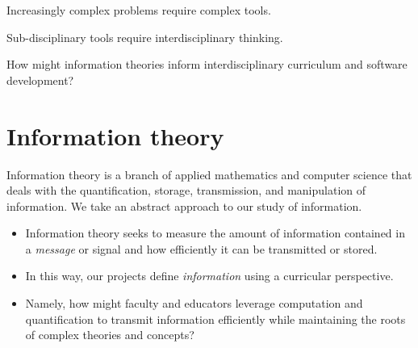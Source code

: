 \documentclass[
  letterpaper,
  DIV=11,
  numbers=noendperiod]{scrartcl}
\begin{document}
Increasingly complex problems require complex tools.

Sub-disciplinary tools require interdisciplinary thinking.

{How might information theories inform interdisciplinary curriculum and
software development?}

\section{Information theory}\label{information-theory}

Information theory is a branch of applied mathematics and computer
science that deals with the quantification, storage, transmission, and
manipulation of information. {We take an abstract approach to our study
of information.}

\begin{itemize}
\item
  Information theory seeks to measure the amount of information
  contained in a \emph{message} or signal and how efficiently it can be
  transmitted or stored.
\item
  In this way, our projects define \emph{information} using a curricular
  perspective.
\item
  Namely, how might faculty and educators {leverage computation and
  quantification} to transmit information efficiently while {maintaining
  the roots of complex theories and concepts?}
\end{itemize}
\end{document}
